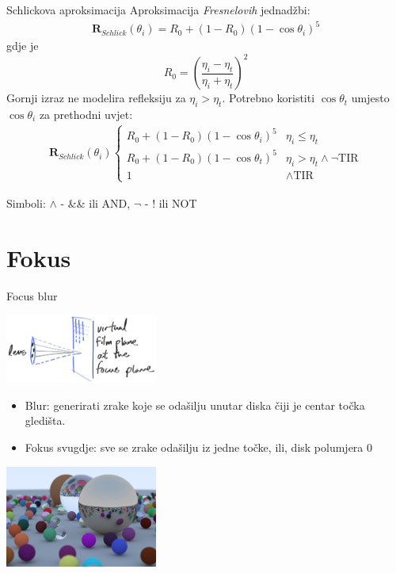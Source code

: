 \documentclass[9pt]{beamer}
\begin{document}
\begin{frame}{Schlickova aproksimacija}
	Aproksimacija \textit{Fresnelovih} jednadžbi:
	\begin{align*}
	\mathbf{R}_{Schlick}(\theta_i) = R_0 + (1-R_0)(1-\cos \theta_i)^5
	\end{align*}
	gdje je 
	$$
	R_0 = \left(\frac{\eta_i-\eta_t}{\eta_i+\eta_t}\right)^2
	$$
	Gornji izraz ne modelira refleksiju za $\eta_i > \eta_t$. Potrebno koristiti $\cos \theta_t$ umjesto $\cos \theta_i$ za prethodni uvjet:
	\begin{align*}
	\mathbf{R}_{Schlick}(\theta_i) \begin{cases}
		R_0 + (1-R_0)(1-\cos \theta_i)^5 & \eta_i\leq\eta_t \\
		R_0 + (1-R_0)(1-\cos \theta_t)^5 & \eta_i > \eta_t \land \neg \mathrm{TIR}\\
		1 & \land \mathrm{TIR}
	\end{cases}      
	\end{align*}
	\begin{tiny}
		Simboli: $\land$ - \&\& ili AND, \qquad $\neg$ - ! ili NOT
	\end{tiny}
\end{frame}

\section{Fokus}
\begin{frame}{Focus blur}
	\begin{center}
		\includegraphics[width=5cm]{slike/fig-1.18-cam-film-plane.jpg}
	\end{center}
\begin{itemize}
	\item Blur: generirati zrake koje se odašilju unutar diska čiji je centar točka gledišta.
	\item Fokus svugdje: sve se zrake odašilju iz jedne točke, ili, disk polumjera $0$
\end{itemize}

	\begin{center}
		\includegraphics[width=5cm]{slike/img-1.21-book1-final.jpg}
	\end{center}
\end{frame}
\end{document}
